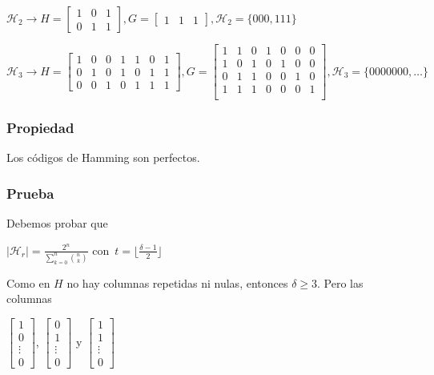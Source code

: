 \documentclass[10pt,a4paper]{article}
\begin{document}
$\mathcal{H}_2 \rightarrow H = \left[\begin{array}{cc|c}1& 0&1\\0&1&1 \end{array}\right], G = \left[\begin{array}{cc|c}1&1&1\end{array}\right], \mathcal{H}_2 = \{000, 111\}$

$\mathcal{H}_3 \rightarrow H = \left[ \begin{array}{ccc|cccc} 1& 0&0&1&1&0&1\\ 0& 1 & 0 & 1 & 0 & 1&1\\ 0 & 0 & 1 & 0 & 1 & 1 & 1 \end{array} \right], G = \left[ \begin{array}{ccc|cccc} 1&1&0&1&0&0&0\\ 1&0&1&0&1&0&0\\ 0&1&1&0&0&1&0\\ 1&1&1&0&0&0&1\\ \end{array} \right], \mathcal{H}_3 = \{0000000, \dots\}$

\subsubsection*{Propiedad}

Los códigos de Hamming son perfectos.

\subsubsection*{Prueba}

Debemos probar que

\begin{center}
$\lvert \mathcal{H}_r\rvert = \frac{2^n}{\sum\limits_{k=0}^n{n \choose k}}$ con $t = \lfloor \frac{\delta -1 }{2}\rfloor$
\end{center}

Como en $H$ no hay columnas repetidas ni nulas, entonces $\delta \geq 3$. Pero las columnas

\begin{center}
$\left[ \begin{array}{c} 1\\ 0\\ \vdots\\ 0 \end{array} \right]$, $\left[ \begin{array}{c} 0\\ 1\\ \vdots\\ 0 \end{array} \right]$ y $\left[ \begin{array}{c} 1\\ 1\\ \vdots\\ 0 \end{array} \right]$
\end{center}
\end{document}

